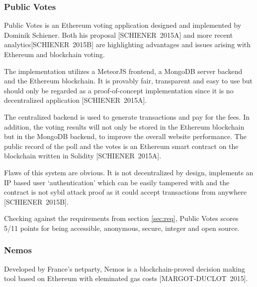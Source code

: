 \documentclass[9pt,oneside]{amsart}
\begin{document}
\begin{multicols}{2}
\subsubsection{Public Votes}
\label{sec:pubv}
Public Votes is an Ethereum voting application designed and implemented by Dominik Schiener. Both his proposal [SCHIENER~2015A] and more recent analytics[SCHIENER~2015B] are highlighting advantages and issues arising with Ethereum and blockchain voting.\par
The implementation utilizes a MeteorJS frontend, a MongoDB server backend and the Ethereum blockchain. It is provably fair, transparent and easy to use but should only be regarded as a proof-of-concept implementation since it is no decentralized application [SCHIENER~2015A].\par
The centralized backend is used to generate transactions and pay for the fees. In addition, the voting results will not only be stored in the Ethereum blockchain but in the MongoDB backend, to improve the overall website performance. The public record of the poll and the votes is an Ethereum smart contract on the blockchain written in Solidity [SCHIENER~2015A].\par
Flaws of this system are obvious. It is not decentralized by design, implements an IP based user \enquote*{authentication} which can be easily tampered with and the contract is not sybil attack proof as it could accept transactions from anywhere [SCHIENER~2015B].\par
Checking against the requirements from section \ref{sec:req}, Public Votes scores 5/11 points for being accessible, anonymous, secure, integer and open source.

\subsubsection{Nemos}
Developed by France's netparty, Nemos is a blockchain-proved decision making tool based on Ethereum with eleminated gas costs [MARGOT-DUCLOT~2015]. %



\end{multicols}
\end{document}
